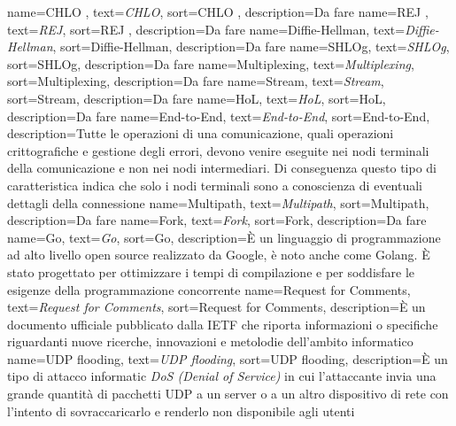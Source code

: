  {
    name=CHLO ,
    text=\emph{CHLO},
    sort=CHLO ,
    description={Da fare}
}
 {
    name=REJ ,
    text=\emph{REJ},
    sort=REJ ,
    description={Da fare}
}
 {
    name=Diffie-Hellman,
    text=\emph{Diffie-Hellman},
    sort=Diffie-Hellman,
    description={Da fare}
}
 {
    name=SHLOg,
    text=\emph{SHLOg},
    sort=SHLOg,
    description={Da fare}
}
 {
    name=Multiplexing,
    text=\emph{Multiplexing},
    sort=Multiplexing,
    description={Da fare}
}
 {
    name=Stream,
    text=\emph{Stream},
    sort=Stream,
    description={Da fare}
}
 {
    name=HoL,
    text=\emph{HoL},
    sort=HoL,
    description={Da fare}
}
 {
    name=End-to-End,
    text=\emph{End-to-End},
    sort=End-to-End,
    description={Tutte le operazioni di una comunicazione, quali operazioni crittografiche e gestione degli errori, devono venire eseguite nei nodi terminali della comunicazione e non nei nodi intermediari. 
    Di conseguenza questo tipo di caratteristica indica che solo i nodi terminali sono a conoscienza di eventuali dettagli della connessione}
}
 {
    name=Multipath,
    text=\emph{Multipath},
    sort=Multipath,
    description={Da fare}
}
 {
    name=Fork,
    text=\emph{Fork},
    sort=Fork,
    description={Da fare}
}
 {
    name=Go,
    text=\emph{Go},
    sort=Go,
    description={È un linguaggio di programmazione ad alto livello open source realizzato da Google, è noto anche come Golang. È stato progettato per ottimizzare i tempi di compilazione e per soddisfare le esigenze della programmazione concorrente}
}
 {
    name=Request for Comments,
    text=\emph{Request for Comments},
    sort=Request for Comments,
    description={È un documento ufficiale pubblicato dalla \gls{IETF} che riporta informazioni o specifiche riguardanti nuove ricerche, innovazioni e metolodie dell'ambito informatico}
}
 {
    name=UDP flooding,
    text=\emph{UDP flooding},
    sort=UDP flooding,
    description={È un tipo di attacco informatic \emph{DoS (Denial of Service)} in cui l'attaccante invia una grande quantità di pacchetti \gls{UDP} a un \gls{server} o a un altro dispositivo di rete con l'intento di sovraccaricarlo e renderlo non disponibile agli utenti}
}